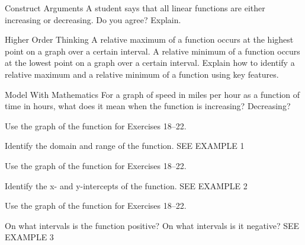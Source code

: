 \documentclass{article}
\newenvironment{practice}[2]{}{}        %
\newcommand{\answer}[1]{}               %
\newcommand{\placeholder}[2]{}          %
\begin{document}
\begin{practice}{15}{3}
Construct Arguments A student says that all linear functions are either increasing or decreasing. Do you agree? Explain.
\answer{No; linear functions can also be constant, which means neither increasing nor decreasing.}
\end{practice}

\begin{practice}{16}{3}
Higher Order Thinking A relative maximum of a function occurs at the highest point on a graph over a certain interval. A relative minimum of a function occurs at the lowest point on a graph over a certain interval. Explain how to identify a relative maximum and a relative minimum of a function using key features.
\answer{A relative maximum occurs when a function changes from increasing to decreasing. A relative minimum occurs when a function changes from decreasing to increasing.}
\end{practice}

\begin{practice}{17}{3}
Model With Mathematics For a graph of speed in miles per hour as a function of time in hours, what does it mean when the function is increasing? Decreasing?
\answer{When the graph is increasing, the speed is increasing. When the graph is decreasing, the speed is decreasing.}
\end{practice}

\begin{practice}{18}{1}
Use the graph of the function for Exercises 18--22.

\placeholder{graph}{Shared graph for Exercises 18--22: upward-opening red parabola with vertex (-1,-9), x-intercepts (-4,0) and (2,0), and y-intercept (0,-8); arrows continue upward on both ends. Unit square grid with horizontal (x) axis ticks labeled -3, -1, 1, 3 and vertical (y) axis ticks -2, -4, -6, -8. Visible window approximately x=-5 to 5 and y=-10 to 2.}

Identify the domain and range of the function. SEE EXAMPLE 1
\answer{domain: (-\infty,\infty); range: [-9,\infty)}
\end{practice}

\begin{practice}{19}{1}
Use the graph of the function for Exercises 18--22.

Identify the x- and y-intercepts of the function. SEE EXAMPLE 2
\answer{x-intercepts: -4, 2; y-intercept: -8}
\end{practice}

\begin{practice}{20}{1}
Use the graph of the function for Exercises 18--22.

On what intervals is the function positive? On what intervals is it negative? SEE EXAMPLE 3
\answer{negative: (-4,2); positive: (-\infty,-4) and (2,\infty)}
\end{practice}
\end{document}
